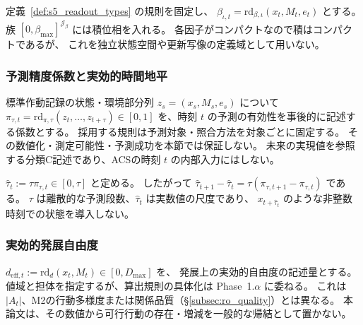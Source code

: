 \begin{definition}[偏向強度の時刻間読み出し]
\label{def:beta_intertime_update}
定義~\ref{def:s5_readout_types} の規則を固定し、
$\beta_{\iota,t}=\mathrm{rd}_{\beta,\iota}(x_t,M_t,e_t)$ とする。
族 $[0,\beta_{\max}]^{\mathcal J_\beta}$ には積位相を入れる。
各因子がコンパクトなので積はコンパクトであるが、
これを独立状態空間や更新写像の定義域として用いない。
\end{definition}

\subsubsection{予測精度係数と実効的時間地平}
\label{subsubsec:s5_prediction_coefficient}
\label{subsec:tau_hat_section5}
\begin{definition}
\label{def:s5_prediction_coefficient}
標準作動記録の状態・環境部分列 $z_s=(x_s,M_s,e_s)$ について
$\pi_{\tau,t}=\mathrm{rd}_{\pi,\tau}(z_t,\ldots,z_{t+\tau})\in[0,1]$
を、時刻 $t$ の予測の有効性を事後的に記述する係数とする。
採用する規則は予測対象・照合方法を対象ごとに固定する。
その数値化・測定可能性・予測成功を本節では保証しない。
未来の実現値を参照する分類C記述であり、ACSの時刻 $t$ の内部入力にはしない。
\end{definition}

\begin{definition}
\label{def:tau_hat_section5}
$\widehat\tau_t:=\tau\pi_{\tau,t}\in[0,\tau]$ と定める。
したがって
$\widehat\tau_{t+1}-\widehat\tau_t=\tau(\pi_{\tau,t+1}-\pi_{\tau,t})$ である。
$\tau$ は離散的な予測段数、$\widehat\tau_t$ は実数値の尺度であり、
$x_{t+\widehat\tau_t}$ のような非整数時刻での状態を導入しない。
\end{definition}

\subsubsection{実効的発展自由度}
\label{subsec:D_eff_section5}
\begin{definition}
\label{def:deff_section5}
$d_{\mathrm{eff},t}:=\mathrm{rd}_d(x_t,M_t)\in[0,D_{\max}]$ を、
発展上の実効的自由度の記述量とする。
値域と担体を指定するが、算出規則の具体化は Phase~1.$\alpha$ に委ねる。
これは $|A_t|$、M2の行動多様度または関係品質（\S\ref{subsec:ro_quality}）とは異なる。
本論文は、その数値から可行行動の存在・増減を一般的な帰結として置かない。
\end{definition}

